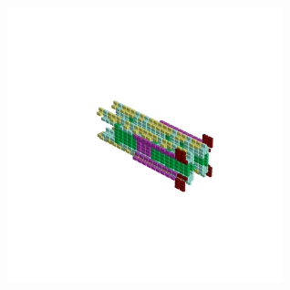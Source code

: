 \begin{minipage}[b]{0.50\linewidth}
\begin{figure}[H]
        \vspace*{-8cm}
        \hspace*{2cm}
        \includegraphics[width=8cm]{src/symmetries/pattern11_4-45.png}
        \vspace*{-2.5cm}
  \caption*{}
  \end{figure}
\end{minipage}
